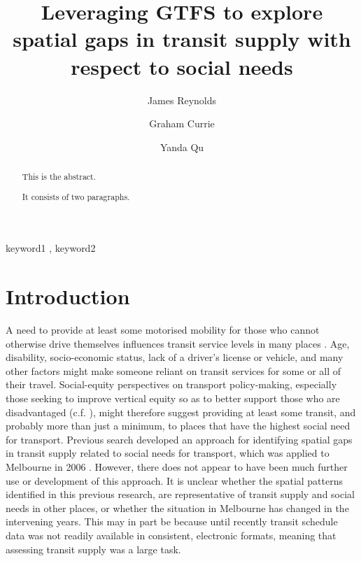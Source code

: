 \documentclass[preprint, 3p,
authoryear]{elsarticle} %
\begin{document}
\begin{frontmatter}

  \title{Leveraging GTFS to explore spatial gaps in transit supply with
respect to social needs}
    \author[Public Transport Research Group (PTRG)]{James Reynolds%
  }
    \author[Public Transport Research Group (PTRG)]{Graham Currie%
  }
    \author[Public Transport Research Group (PTRG)]{Yanda Qu%
  }
  
  \begin{abstract}
  This is the abstract.

  It consists of two paragraphs.
  \end{abstract}
    \begin{keyword}
    keyword1 \sep 
    keyword2
  \end{keyword}
  
 \end{frontmatter}

\section{Introduction}\label{introduction}

A need to provide at least some motorised mobility for those who cannot
otherwise drive themselves influences transit service levels in many
places \citep{Currie:2016aa}. Age, disability, socio-economic status,
lack of a driver's license or vehicle, and many other factors might make
someone reliant on transit services for some or all of their travel.
Social-equity perspectives on transport policy-making, especially those
seeking to improve vertical equity so as to better support those who are
disadvantaged (c.f. \citet{Litman:2016aa}), might therefore suggest
providing at least some transit, and probably more than just a minimum,
to places that have the highest social need for transport. Previous
search developed an approach for identifying spatial gaps in transit
supply related to social needs for transport, which was applied to
Melbourne in 2006 \citep{Currie2007Identifying, currie2010identifying}.
However, there does not appear to have been much further use or
development of this approach. It is unclear whether the spatial patterns
identified in this previous research, are representative of transit
supply and social needs in other places, or whether the situation in
Melbourne has changed in the intervening years. This may in part be
because until recently transit schedule data was not readily available
in consistent, electronic formats, meaning that assessing transit supply
was a large task.
\end{document}
